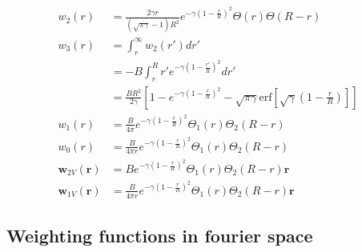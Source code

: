 \documentclass[letterpaper,twocolumn,amsmath,amssymb,prb]{revtex4-1}
\newcommand{\rr}{\textbf{r}}
\begin{document}
\begin{align}
  w_2(r) &=\frac{2\gamma r}
  {(\sqrt{\pi \gamma}-1)R^2}e^{-\gamma \left ( 1 - \frac{r}{R} \right)^2}
           \Theta(r) \Theta(R - r )\\
  w_3(r) &= \int_r^\infty w_2(r') dr'\\
         &= -B \int_r^R r' e^{-\gamma \left(1- \frac{r'}{R} \right)^2}dr'\\
         &= \frac{B R^2}{2\gamma}\left[ 1 - e^{-\gamma
      \left(1-\frac{r}{R} \right)^2} - \sqrt{\pi \gamma} \mathrm{erf} \left[
        \sqrt{\gamma} \left( 1- \frac{r}{R} \right) \right] \right]\\
  w_1(r) &= \frac{B}{4\pi}e^{-\gamma \left ( 1 - \frac{r}{R}
            \right)^2} \Theta_1(r) \Theta_2 (R - r)\\
  w_0(r) &= \frac{B}{4\pi r}e^{-\gamma \left ( 1 - \frac{r}{R}
            \right)^2} \Theta_1(r) \Theta_2 (R - r)\\
  \mathbf{w}_{2V}(\rr) &= B e^{-\gamma \left ( 1 - \frac{r}{R} \right)^2}
           \Theta_1(r) \Theta_2 (R - r) \rr\\
  \mathbf{w}_{1V}(\rr) &= \frac{B}{4\pi r} e^{-\gamma \left ( 1 - \frac{r}{R} \right)^2}
           \Theta_1(r) \Theta_2 (R - r )\rr
\end{align}

\subsection{Weighting functions in fourier space}\
\end{document}
